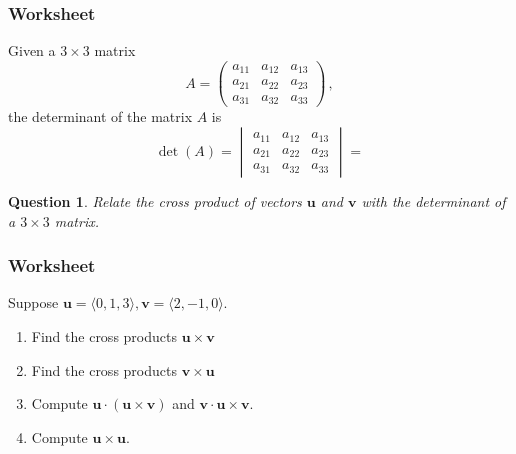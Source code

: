 \documentclass[aspectratio=169]{beamer}
\newtheorem*{question}{Question}
\newcommand{\vect}{\mathbf}
\begin{document}
\begin{frame}
    \frametitle{Worksheet}
    Given a  $3\times 3$ matrix
    \begin{equation*}
        A =
        \begin{pmatrix}
            a_{11} & a_{12} & a_{13} \\
            a_{21} & a_{22} & a_{23} \\
            a_{31} & a_{32} & a_{33} 
        \end{pmatrix}\,,
    \end{equation*}
    the determinant of the matrix $A$ is
    \begin{equation*}
        \det(A) = 
        \begin{vmatrix}
            a_{11} & a_{12} & a_{13} \\
            a_{21} & a_{22} & a_{23} \\
            a_{31} & a_{32} & a_{33} 
        \end{vmatrix}
        = 
    \end{equation*}
    \begin{question}
        Relate the cross product of vectors $\vect{u}$ and $\vect{v}$ with the 
        determinant of a $3\times 3$ matrix.
    \end{question}
\end{frame}

\begin{frame}
    \frametitle{Worksheet}
    Suppose $\vect{u} = \langle 0,1,3\rangle, \vect{v} = \langle 2,-1,0\rangle$.
    \begin{enumerate}
        \item Find the cross products $\vect{u} \times \vect{v}$
        \item Find the cross products $\vect{v} \times \vect{u}$
        \item Compute  $\vect{u} \cdot (\vect{u} \times \vect{v})$
            and $\vect{v} \cdot \vect{u} \times \vect{v}$.
        \item Compute $\vect{u} \times \vect{u}$.
    \end{enumerate}
\end{frame}
\end{document}
